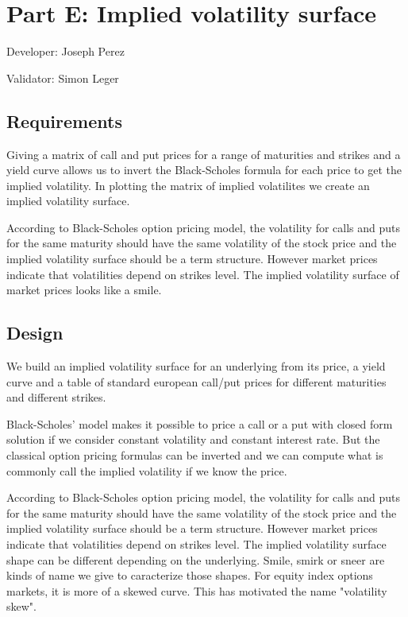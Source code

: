 \chapter{Part E: Implied volatility surface}
Developer: Joseph Perez

\noindent Validator: Simon Leger


\section{Requirements}

Giving a matrix of call and put prices for a range of maturities and strikes and a yield curve allows us to invert the Black-Scholes formula for each price to get the implied volatility.
In plotting the matrix of implied volatilites we create an implied volatility surface.

According to Black-Scholes option pricing model, the volatility for calls and puts for the same maturity should have the same volatility of the stock price and the implied volatility surface should be a term structure.
However market prices indicate that volatilities depend on strikes level.
The implied volatility surface of market prices looks like a smile.

\section{Design }

We build an implied volatility surface for an underlying from its price, a yield curve and a table of standard european call/put prices for different maturities and different strikes.

Black-Scholes' model makes it possible to price a call or a put with closed form solution if we consider constant volatility  and constant interest rate. But the classical option pricing formulas can be inverted and we can compute what is commonly call the implied volatility if we know the price.

According to Black-Scholes option pricing model, the volatility for calls and puts for the same maturity should have the same volatility of the stock price and the implied volatility surface should be a term structure.
However market prices indicate that volatilities depend on strikes level.
The implied volatility surface shape can be different depending on the underlying. Smile, smirk or sneer are kinds of name we give to caracterize those shapes. For equity index options markets, it is more of a skewed curve. This has motivated the name  "volatility skew".




